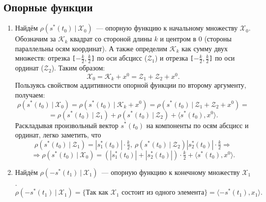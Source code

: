 \documentclass[a4paper,11pt]{article}
\begin{document}
\subsection{Опорные функции}
\begin{enumerate}
\item Найдём $ \rho{(s^{*}(t_0) \ | \ \mathcal{X}_0)}$~--- опорную функцию к начальному множеству $\mathcal{X}_0$. \\
Обозначим за $\mathcal{K}_k $ квадрат со стороной длины $k$ и центром в 0 (стороны параллельны осям координат). А также определим $\mathcal{K}_k$ как сумму двух множеств: отрезка \texttt{[$-\frac{k}{2},\frac{k}{2}$]} по оси абсцисс ($\mathcal{Z}_1$) и отрезка \texttt{[$-\frac{k}{2},\frac{k}{2}$]} по оси ординат ($\mathcal{Z}_2$). Таким образом: 
\[ \mathcal{X}_0 = \mathcal{K}_k + x^0 = \mathcal{Z}_1 + \mathcal{Z}_2 + x^0. \] 
Пользуясь свойством аддитивности опорной функции по второму аргументу, получаем: 
\[ \rho{(s^{*}(t_0) \ | \ \mathcal{X}_0)} = \rho{(s^{*}(t_0) \ | \ \mathcal{K}_k + x^0)} = \rho{(s^{*}(t_0) \ | \ \mathcal{Z}_1 + \mathcal{Z}_2 + x^0)} = \]
\[ = \rho{(s^{*}(t_0) \ | \ \mathcal{Z}_1)} + \rho{(s^{*}(t_0) \ | \ \mathcal{Z}_2)} + \langle s^{*}(t_0), x^0 \rangle. \] 
Раскладывая произвольный вектор $s^{*}(t_0)$ на компоненты по осям абсцисс и ординат, легко заметить, что 
\[  \rho{(s^{*}(t_0) \ | \ \mathcal{Z}_1)} = |s_1^{*}(t_0)| \cdot \tfrac{k}{2}, \ \rho{(s^{*}(t_0) \ | \ \mathcal{Z}_2)}  |s_2^{*}(t_0)| \cdot \tfrac{k}{2} \Rightarrow \] 
\[\Rightarrow \rho{(s^{*}(t_0) \ | \ \mathcal{X}_0)} = (|s_1^{*}(t_0)| + |s_2^{*}(t_0)|) \cdot \tfrac{k}{2} + \langle s^{*}(t_0), x^0 \rangle. \]

\item Найдём $ \rho{(-s^{*}(t_1) \ | \ \mathcal{X}_1)}$~--- опорную функцию к конечному множеству $\mathcal{X}_1$. \\
\[ \rho{(-s^{*}(t_1) \ | \ \mathcal{X}_1)} = \{ \text{Так как $\mathcal{X}_1$ состоит из одного элемента}\} = \langle -s^{*}(t_1), x_1 \rangle.\] 


\end{enumerate}
\end{document}
